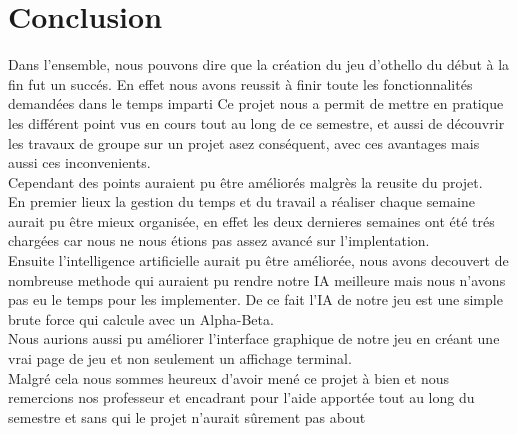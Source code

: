 \section{Conclusion}
Dans l'ensemble, nous pouvons dire que la création du jeu d'othello du début à la fin fut un succés.
En effet nous avons reussit à finir toute les fonctionnalités demandées dans le temps imparti
Ce projet nous a permit de mettre en pratique les différent point vus en cours tout au long de ce semestre, et aussi de découvrir  les travaux de groupe  sur un projet asez conséquent, avec ces avantages mais aussi ces inconvenients.
\\ Cependant des points auraient pu être améliorés malgrès la reusite du projet.
\\ En premier lieux la gestion du temps et du travail a réaliser chaque semaine  aurait pu être mieux organisée, en effet les deux dernieres semaines ont été trés chargées car nous ne nous étions pas assez avancé sur l'implentation.
\\Ensuite l'intelligence artificielle aurait pu être améliorée, nous avons decouvert de nombreuse methode qui auraient pu rendre notre IA meilleure mais nous n'avons pas eu le temps pour les implementer. De ce fait l'IA de notre jeu est une simple brute force qui calcule avec un Alpha-Beta.
\\ Nous aurions aussi pu améliorer l'interface graphique de notre jeu en créant une vrai page de jeu et non seulement un affichage terminal.
\\Malgré cela nous sommes heureux d'avoir mené ce projet à bien et nous remercions nos professeur et encadrant pour l'aide apportée tout au long du semestre et sans qui le projet n'aurait sûrement pas about
